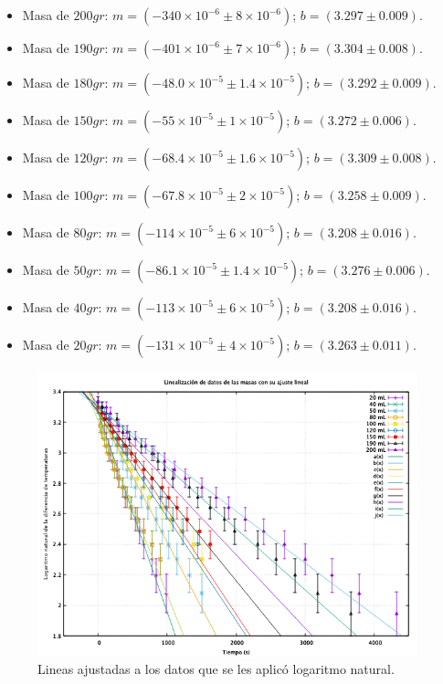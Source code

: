 \documentclass[a4paper]{article}
\begin{document}
\begin{itemize}
  \item Masa de $200 gr$: $m=(-340\times10^{-6}\pm8\times10^{-6})$; $b=(3.297\pm0.009)$.
  \item Masa de $190 gr$: $m=(-401\times10^{-6}\pm7\times10^{-6})$; $b=(3.304\pm0.008)$.
  \item Masa de $180 gr$: $m=(-48.0\times10^{-5}\pm1.4\times10^{-5})$;  $b=(3.292\pm0.009)$.
  \item Masa de $150 gr$: $m=(-55\times10^{-5}\pm1\times10^{-5})$;   $b=(3.272\pm0.006)$.
  \item Masa de $120 gr$: $m=(-68.4\times10^{-5}\pm1.6\times10^{-5})$; $b=(3.309\pm0.008)$.
  \item Masa de $100 gr$: $m=(-67.8\times10^{-5}\pm2\times10^{-5})$; $b=(3.258\pm0.009)$.
  \item Masa de $80 gr$:  $m=(-114\times10^{-5}\pm6\times10^{-5})$;   $b=(3.208\pm0.016)$.
  \item Masa de $50 gr$:  $m=(-86.1\times10^{-5}\pm1.4\times10^{-5})$; $b=(3.276\pm0.006)$.
  \item Masa de $40 gr$:  $m=(-113\times10^{-5}\pm6\times10^{-5})$;   $b=(3.208\pm0.016)$.
  \item Masa de $20 gr$:  $m=(-131\times10^{-5}\pm4\times10^{-5})$;   $b=(3.263\pm0.011)$.
\end{itemize}

\begin{figure}[H]
    \centering
    \includegraphics[width=11cm]{LINEASALV.png}%
    \caption{Lineas ajustadas a los datos que se les aplicó logaritmo natural.}%
\end{figure}
\end{document}

